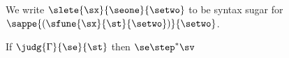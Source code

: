 \documentclass{article}
\begin{document}
\begin{figure}
  \begin{mathpar}
  \end{mathpar}
\end{figure}

We write $\slete{\sx}{\seone}{\setwo}$ to be syntax sugar for $\sappe{(\sfune{\sx}{\st}{\setwo})}{\setwo}$.

\begin{theorem}
  If $\judg{\Gamma}{\se}{\st}$ then $\se \step^* \sv$
\end{theorem}


\begin{figure}
  \begin{mathpar}
  \end{mathpar}
\end{figure}
\end{document}
